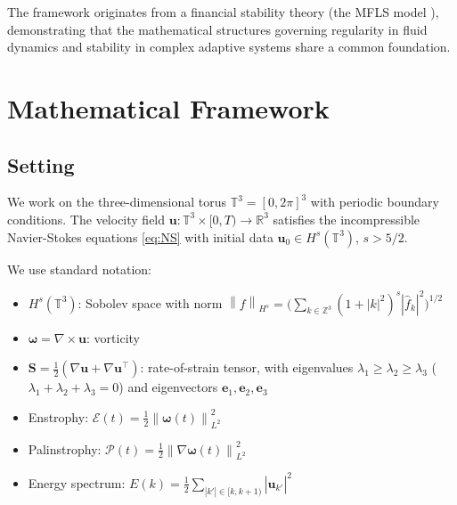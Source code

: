\documentclass[12pt, a4paper]{article}
\newcommand{\R}{\mathbb{R}}
\newcommand{\T}{\mathbb{T}}
\newcommand{\norm}[1]{\left\| #1 \right\|}
\begin{document}
The framework originates from a financial stability theory
(the MFLS model \cite{odeyemi2025mfls}), demonstrating that
the mathematical structures governing regularity in fluid dynamics
and stability in complex adaptive systems share a common foundation.


\section{Mathematical Framework}\label{sec:framework}

\subsection{Setting}

We work on the three-dimensional torus
$\T^3 = [0, 2\pi]^3$ with periodic boundary conditions.
The velocity field $\mathbf{u}: \T^3 \times [0,T) \to \R^3$
satisfies the incompressible Navier-Stokes equations \eqref{eq:NS}
with initial data $\mathbf{u}_0 \in H^s(\T^3)$, $s > 5/2$.

We use standard notation:
\begin{itemize}
\item $H^s(\T^3)$: Sobolev space with norm
  $\norm{f}_{H^s} = \bigl(\sum_{k \in \mathbb{Z}^3}
  (1 + |k|^2)^s |\hat{f}_k|^2\bigr)^{1/2}$

\item $\boldsymbol{\omega} = \nabla \times \mathbf{u}$: vorticity

\item $\mathbf{S} = \tfrac{1}{2}(\nabla\mathbf{u} + \nabla\mathbf{u}^\top)$:
  rate-of-strain tensor, with eigenvalues
  $\lambda_1 \geq \lambda_2 \geq \lambda_3$ ($\lambda_1 + \lambda_2 + \lambda_3 = 0$)
  and eigenvectors $\mathbf{e}_1, \mathbf{e}_2, \mathbf{e}_3$

\item Enstrophy: $\mathcal{E}(t) = \frac{1}{2}\norm{\boldsymbol{\omega}(t)}_{L^2}^2$

\item Palinstrophy: $\mathcal{P}(t) = \frac{1}{2}\norm{\nabla\boldsymbol{\omega}(t)}_{L^2}^2$

\item Energy spectrum: $E(k) = \frac{1}{2} \sum_{|k'| \in [k, k+1)} |\hat{\mathbf{u}}_{k'}|^2$
\end{itemize}
\end{document}
